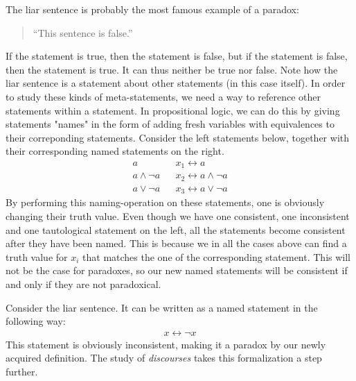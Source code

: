 The liar sentence is probably the most famous example of a paradox:
\begin{quote}
  ``This sentence is false.''
\end{quote}
If the statement is true, then the statement is false, but if the statement is false, then the statement is true.
It can thus neither be true nor false.
Note how the liar sentence is a statement about other statements (in this case itself).
In order to study these kinds of meta-statements, we need a way to reference other statements within a statement.
In propositional logic, we can do this by giving statements "names" in the form of adding fresh variables with equivalences to their correponding statements.
Consider the left statements below, together with their corresponding named statements on the right.
\begin{align}
  a               && x_1 \leftrightarrow a\\
  a \wedge \neg a && x_2 \leftrightarrow a \wedge \neg a\\
  a \vee \neg a   && x_3 \leftrightarrow a \vee \neg a
\end{align}
By performing this naming-operation on these statements, one is obviously changing their truth value.
Even though we have one consistent, one inconsistent and one tautological statement on the left, all the statements become consistent after they have been named.
This is because we in all the cases above can find a truth value for $x_i$ that matches the one of the corresponding statement.
This will not be the case for paradoxes, so our new named statements will be consistent if and only if they are not paradoxical.

Consider the liar sentence.  It can be written as a named statement in the following way:
\begin{align}
  x \leftrightarrow \neg x
\end{align}
This statement is obviously inconsistent, making it a paradox by our newly acquired definition.  The study of \textit{discourses} takes this formalization a step further.
